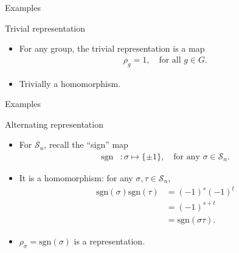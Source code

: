 \documentclass[10pt]{beamer}
\newcommand{\Sym}{\mathcal{S}}
\newcommand{\sgn}{\text{sgn}}
\begin{document}
	\begin{frame}{Examples}\pause
		\begin{block}{Trivial representation}
			\begin{itemize}
				\item For any group, the trivial representation is a map
				\begin{align*}
					\rho_g = 1, \quad \text{for all $g \in G$.}
				\end{align*}
				
				\item Trivially a homomorphism.
			\end{itemize}
			
		\end{block}
	\end{frame}
	\begin{frame}{Examples}
%				
%				

		\begin{block}{Alternating representation}
			\begin{itemize}
				\item For $\Sym_n$, recall the ``sign'' map
				\begin{align*}
					\sgn &: \sigma \mapsto \{\pm 1\}, \quad \text{for any } \sigma \in \Sym_n.
				\end{align*}\pause
				
				\item It is a homomorphism: for any $\sigma, \tau \in \Sym_n$,
				\begin{align*}
					\sgn(\sigma)\sgn(\tau) &= (-1)^s(-1)^t \\
					&= (-1)^{s+t} \\
					&= \sgn(\sigma\tau).
				\end{align*}\pause
				
				\item $\rho_\sigma = \sgn(\sigma)$ is a representation.
			\end{itemize}
		\end{block}
	\end{frame}
\end{document}
